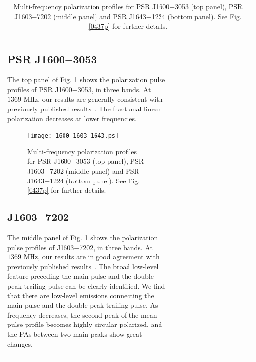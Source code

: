 \documentclass[useAMS,usenatbib]{mn2e}
\begin{document}
\begin{table}
\begin{center}
\begin{tabular}{lcccccccccccc}
\subsection{PSR J1600$-$3053}

The top panel of Fig. \ref{1600p} shows the polarization pulse profiles of 
PSR J1600$-$3053, in three bands.
%
At $1369$ MHz, our results are generally consistent with previously published
results~\citep{Ord04,Yan11}.
%
The fractional linear polarization decreases at lower frequencies.

%
%
%
%


\begin{figure}
\begin{center}
\texttt{[image: 1600\_1603\_1643.ps]}
\caption{Multi-frequency polarization profiles for PSR J1600$-$3053 (top 
panel), PSR J1603$-$7202 (middle panel) and PSR J1643$-$1224 (bottom panel). 
See Fig. \ref{0437p} for further details.}
\label{1600p}
\end{center}
\end{figure}

\subsection{J1603$-$7202}

The middle panel of Fig. \ref{1600p} shows the polarization pulse profiles of 
J1603$-$7202, in three bands.
%
At $1369$ MHz, our results are in good agreement with previously published
results~\citep{Ord04,Yan11}.
%
The broad low-level feature preceding the main pulse and the double-peak trailing 
pulse can be clearly identified.
%
We find that there are low-level emissions connecting the main pulse and the 
double-peak trailing pulse.
%
As frequency decreases, the second peak of the mean pulse profile becomes highly 
circular polarized, and the PAs between two main peaks show great changes.


\end{tabular}
\end{center}
\end{table}
\end{document}
